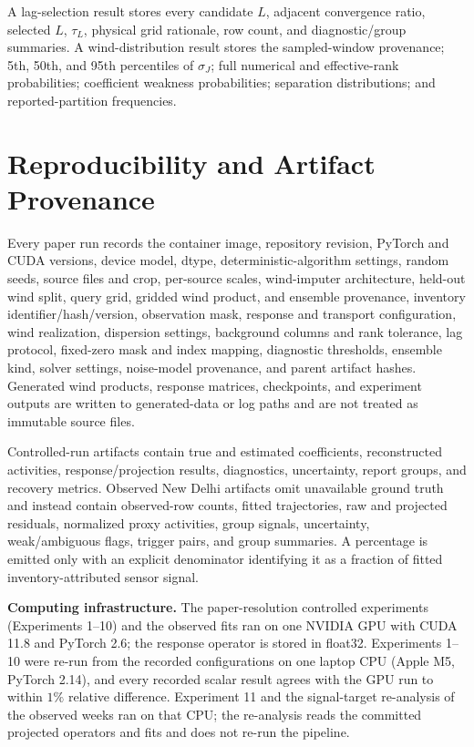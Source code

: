 A lag-selection result stores every candidate \(L\), adjacent convergence
ratio, selected \(L\), \(\tau_L\), physical grid rationale, row count, and
diagnostic/group summaries.  A wind-distribution result stores the sampled-window
provenance; 5th, 50th, and 95th percentiles of \(\sigma_J\); full numerical and
effective-rank probabilities; coefficient weakness probabilities; separation
distributions; and reported-partition frequencies.

\section{Reproducibility and Artifact Provenance}
\label{app:reproducibility}

Every paper run records the container image, repository revision, PyTorch and
CUDA versions, device model, dtype, deterministic-algorithm settings, random
seeds, source files and crop, per-source scales, wind-imputer architecture, held-out wind split, query grid, gridded wind product, and ensemble provenance,
inventory identifier/hash/version, observation mask, response and transport
configuration, wind realization, dispersion settings, background columns and
rank tolerance, lag protocol, fixed-zero mask and index mapping, diagnostic
thresholds, ensemble kind, solver settings, noise-model provenance, and parent
artifact hashes.
Generated wind products, response matrices, checkpoints, and experiment outputs
are written to generated-data or log paths and are not treated as immutable
source files.

Controlled-run artifacts contain true and estimated coefficients, reconstructed
activities, response/projection results, diagnostics, uncertainty, report
groups, and recovery metrics.  Observed New Delhi artifacts omit unavailable
ground truth and instead contain observed-row counts, fitted trajectories, raw
and projected residuals, normalized proxy activities, group signals,
uncertainty, weak/ambiguous flags, trigger pairs, and group summaries.  A
percentage is emitted only with an explicit denominator identifying it as a
fraction of fitted inventory-attributed sensor signal.

\noindent\textbf{Computing infrastructure.}
The paper-resolution controlled experiments (Experiments 1--10) and the observed fits
ran on one NVIDIA GPU with CUDA 11.8 and PyTorch 2.6; the response operator is stored in float32.  Experiments 1--10 were
re-run from the recorded configurations on one laptop CPU (Apple M5, PyTorch 2.14), and
every recorded scalar result agrees with the GPU run to within \(1\%\) relative
difference.
Experiment 11 and the signal-target re-analysis of the observed
weeks ran on that CPU; the re-analysis reads the committed projected operators and fits
and does not re-run the pipeline.

